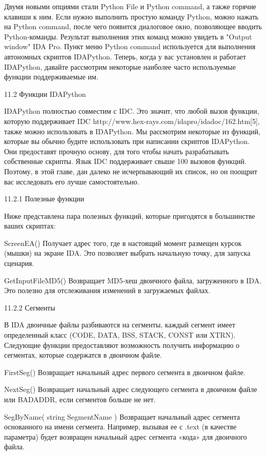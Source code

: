 \documentclass[12pt]{book}
\begin{document}
Двумя новыми опциями стали Python File и Python command, а также горячие клавиши к ним. Если нужно выполнить простую команду Python, можно нажать на Python command, после чего появится диалоговое окно, позволяющее вводить Python-команды. Результат выполнения этих команд можно увидеть в "Output window" IDA Pro. Пункт меню Python command используется для выполнения автономных скриптов IDAPython. Теперь, когда у вас установлен и работает IDAPython, давайте рассмотрим некоторые наиболее часто используемые функции поддерживаемые им.


11.2 Функции IDAPython

IDAPython полностью совместим с IDC. Это значит, что любой вызов функции, которую поддерживает IDC http://www.hex-rays.com/idapro/idadoc/162.htm[5], также можно использовать в IDAPython. Мы рассмотрим некоторые из функций, которые вы обычно будите использовать при написании скриптов IDAPython. Они предоставят прочную основу, для того чтобы начать разрабатывать собственные скрипты. Язык IDC поддерживает свыше 100 вызовов функций. Поэтому, в этой главе, дан далеко не исчерпывающий их список, но он поощрит вас исследовать его лучше самостоятельно.

11.2.1 Полезные функции

Ниже представлена пара полезных функций, которые пригодятся в большинстве ваших скриптах:

ScreenEA()
Получает адрес того, где в настоящий момент размещен курсок (мышки) на экране IDA. Это позволяет выбрать начальную точку, для запуска сценария.

GetInputFileMD5()
Возвращает MD5-хеш двоичного файла, загруженного в IDA. Это полезно для отслеживания изменений в загружаемых файлах.

11.2.2 Сегменты

В IDA двоичные файлы разбиваются на сегменты, каждый сегмент имеет определенный класс (CODE, DATA, BSS, STACK, CONST или XTRN). Следующие функции предоставляют возможность получить информацию о сегментах, которые содержатся в двоичном файле.

FirstSeg()
Возвращает начальный адрес первого сегмента в двоичном файле.

NextSeg()
Возвращает начальный адрес следующего сегмента в двоичном файле или BADADDR, если сегментов больше не нет.

SegByName( string SegmentName )
Возвращает начальный адрес сегмента основанного на имени сегмента. Например, вызывая ее с .text (в качестве параметра) будет возвращен начальный адрес сегмента «кода» для двоичного файла.
\end{document}
